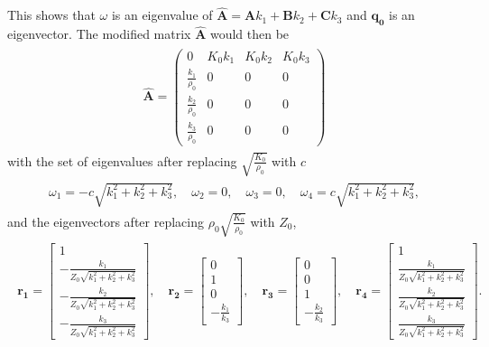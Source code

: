 This shows that $\omega$ is an eigenvalue of $\mathbf{\hat{A}} = \mathbf{A}k_1 + \mathbf{B}k_2 + \mathbf{C}k_3$ and $\mathbf{q_0}$ is an eigenvector. The modified matrix $\mathbf{\hat{A}}$ would then be
\begin{align}
    \begin{split}
    \mathbf{\hat{A}} = \left(\begin{array}{rrrr}
0 & K_{0} k_{1} & K_{0} k_{2} & K_{0} k_{3} \\
\frac{k_{1}}{\rho_{0}} & 0 & 0 & 0 \\
\frac{k_{2}}{\rho_{0}} & 0 & 0 & 0 \\
\frac{k_{3}}{\rho_{0}} & 0 & 0 & 0
\end{array}\right)
    \end{split}
\end{align}
with the set of eigenvalues after replacing $\sqrt{\frac{K_{0}}{\rho_{0}}}$ with $c$
\begin{align}
    \begin{split}
        \omega_1 = -c \sqrt{k_{1}^{2} + k_{2}^{2} + k_{3}^{2}}, \quad
        \omega_2 = 0, \quad
        \omega_3 = 0, \quad 
        \omega_4 = c \sqrt{k_{1}^{2} + k_{2}^{2} + k_{3}^{2}},
    \end{split}
\end{align}
and the eigenvectors after replacing $\rho_0 \sqrt{\frac{K_0}{\rho_0}}$ with $Z_0$,
\begin{align}
    \begin{split}
    \mathbf{r_1} = \begin{bmatrix}
        1 \\
-\frac{k_{1}}{Z_0 \sqrt{k_{1}^{2} + k_{2}^{2} + k_{3}^{2}}} \\
-\frac{k_{2}}{Z_0 \sqrt{k_{1}^{2} + k_{2}^{2} + k_{3}^{2}}} \\
-\frac{k_{3}}{Z_0 \sqrt{k_{1}^{2} + k_{2}^{2} + k_{3}^{2}}}
        \end{bmatrix}, \quad
        \mathbf{r_2} = \begin{bmatrix}
            0 \\
1 \\
0 \\
-\frac{k_{1}}{k_{3}}
            \end{bmatrix}, \quad
            \mathbf{r_3} = \begin{bmatrix}
                0 \\
                0 \\
                1 \\
                -\frac{k_{2}}{k_{3}}
                \end{bmatrix}, \quad
                \mathbf{r_4} = \begin{bmatrix}
                    1 \\
\frac{k_{1}}{Z_0 \sqrt{k_{1}^{2} + k_{2}^{2} + k_{3}^{2}}} \\
\frac{k_{2}}{Z_0 \sqrt{k_{1}^{2} + k_{2}^{2} + k_{3}^{2}}} \\
\frac{k_{3}}{Z_0 \sqrt{k_{1}^{2} + k_{2}^{2} + k_{3}^{2}}}
                    \end{bmatrix} .
    \end{split}
\end{align}

